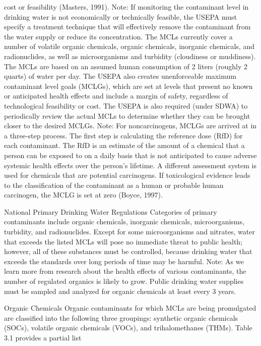 \documentclass{article}
\begin{document}
\begin{enumerate}
  cost or feasibility (Masters, 1991). Note: If monitoring the
  contaminant level in drinking water is not economically or technically
  feasible, the USEPA must specify a treatment technique that will
  effectively remove the contaminant from the water supply or reduce its
  concentration. The MCLs currently cover a number of volatile organic
  chemicals, organic chemicals, inorganic chemicals, and radionuclides,
  as well as microorganisms and turbidity (cloudiness or muddiness). The
  MCLs are based on an assumed human consumption of 2 liters (roughly 2
  quarts) of water per day. The USEPA also creates unenforceable maximum
  contaminant level goals (MCLGs), which are set at levels that present
  no known or anticipated health effects and include a margin of safety,
  regardless of technological feasibility or cost. The USEPA is also
  required (under SDWA) to periodically review the actual MCLs to
  determine whether they can be brought closer to the desired MCLGs.
  Note: For noncarcinogens, MCLGs are arrived at in a three-step
  process. The first step is calculating the reference dose (RfD) for
  each contaminant. The RfD is an estimate of the amount of a chemical
  that a person can be exposed to on a daily basis that is not
  anticipated to cause adverse systemic health effects over the person's
  lifetime. A different assessment system is used for chemicals that are
  potential carcinogens. If toxicological evidence leads to the
  classification of the contaminant as a human or probable human
  carcinogen, the MCLG is set at zero (Boyce, 1997).
\end{enumerate}

National Primary Drinking Water Regulations Categories of primary
contaminants include organic chemicals, inorganic chemicals,
microorganisms, turbidity, and radionuclides. Except for some
microorganisms and nitrates, water that exceeds the listed MCLs will
pose no immediate threat to public health; however, all of these
substances must be controlled, because drinking water that exceeds the
standards over long periods of time may be harmful. Note: As we learn
more from research about the health effects of various contaminants, the
number of regulated organics is likely to grow. Public drinking water
supplies must be sampled and analyzed for organic chemicals at least
every 3 years.

Organic Chemicals Organic contaminants for which MCLs are being
promulgated are classified into the following three groupings: synthetic
organic chemicals (SOCs), volatile organic chemicals (VOCs), and
trihalomethanes (THMs). Table 3.1 provides a partial list
\end{document}
